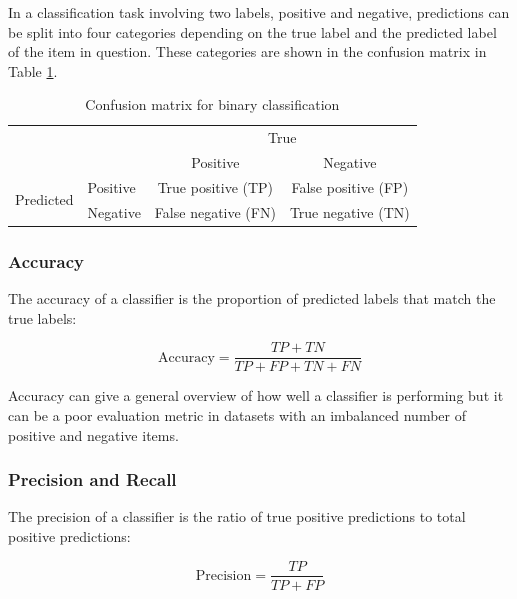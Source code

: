 In a classification task involving two labels, positive and negative, predictions can be split into four categories depending on the true label and the predicted label of the item in question. These categories are shown in the confusion matrix in Table \ref{tab:Explain_ConfMat}.

\renewcommand\arraystretch{1.5}
\begin{table}[ht]
    \centering
    \begin{tabular}{l|l|c|c|}
        \multicolumn{2}{c}{} & \multicolumn{2}{c}{True}\\
        \cline{3-4}
        \multicolumn{2}{c|}{} & Positive & Negative\\
        \cline{2-4}
        \multirow{2}{*}{Predicted}& Positive & True positive (TP) & False positive (FP)\\
        \cline{2-4}
        & Negative & False negative (FN) & True negative (TN)\\
        \cline{2-4}
    \end{tabular}
    \caption{Confusion matrix for binary classification}
    \label{tab:Explain_ConfMat}
\end{table}

\subsubsection{Accuracy}

The accuracy of a classifier is the proportion of predicted labels that match the true labels:

\begin{equation*}
    \mathrm{Accuracy} = \frac{TP + TN}{TP + FP + TN + FN}
\end{equation*}

Accuracy can give a general overview of how well a classifier is performing but it can be a poor evaluation metric in datasets with an imbalanced number of positive and negative items.

\subsubsection{Precision and Recall}

The precision of a classifier is the ratio of true positive predictions to total positive predictions:

\begin{equation*}
    \mathrm{Precision} = \frac{TP}{TP + FP}
\end{equation*}

